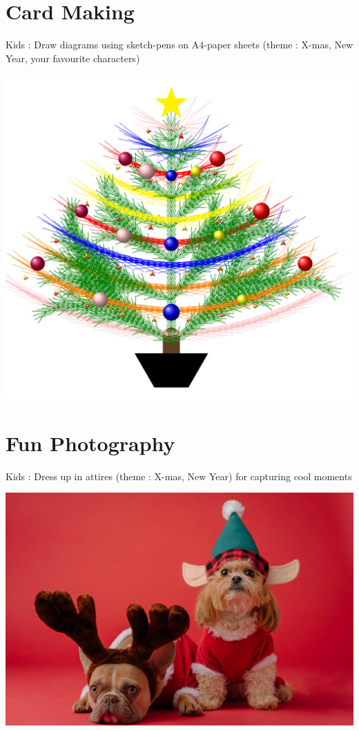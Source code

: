\documentclass[makeidx, 11pt, oneside, onecolumn, openright, final, svgnames, dvipsnames, extrafontsizes]{memoir}
\begin{document}
\renewcommand{\chaptername}{Celebration}

\chapter{Card Making}
\thispagestyle{empty}

Kids : Draw diagrams using sketch-pens on A4-paper sheets (theme : X-mas, New Year, your favourite characters)
\begin{center}
\includegraphics[scale=1]{christmas-tree.jpeg}
\end{center}

\chapter{Fun Photography}
\thispagestyle{empty}

Kids : Dress up in attires (theme : X-mas, New Year) for capturing cool moments 

\begin{center}
\includegraphics[scale=1]{dog.jpeg}
\end{center}
\end{document}
